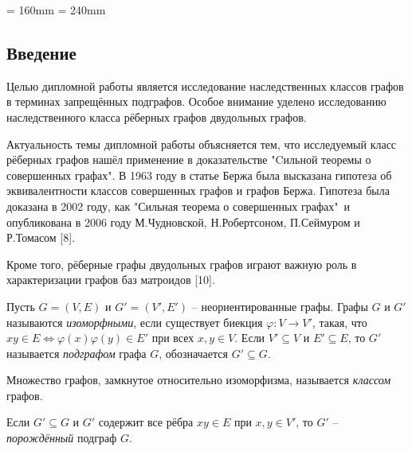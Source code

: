 \documentclass[12pt]{article}
\begin{document}
\large


\textwidth = 160mm
\textheight = 240mm



\newpage

\tableofcontents %

\newpage
\begin{center}
	\section*{Введение}
\end{center} 
	

Целью дипломной работы является исследование наследственных классов графов в терминах запрещённых подграфов. Особое внимание уделено исследованию наследственного класса рёберных графов двудольных графов.

Актуальность темы дипломной работы объясняется тем, что исследуемый класс рёберных графов нашёл применение в доказательстве "Cильной теоремы о совершенных графах". В 1963 году в статье  Бержа была высказана гипотеза об эквивалентности классов совершенных графов и графов Бержа. Гипотеза была доказана в 2002 году, как "Сильная теорема о совершенных графах"\ и опубликована в 2006 году М.Чудновской, Н.Робертсоном, П.Сеймуром и Р.Томасом [8].

Кроме того, рёберные графы двудольных графов играют важную роль в характеризации графов баз матроидов [10].

Пусть $G=(V,E)$ и $ G'=(V',E')$ -- неориентированные графы. Графы $G$ и $G'$ называются {\it изоморфными}, если существует биекция $\varphi : V \to V'$, такая, что $xy \in E \Leftrightarrow \varphi(x)\varphi(y) \in E'$ при всех $ x,y \in V$. Если $ V' \subseteq V$ и $E' \subseteq E$, то $G'$ называется {\it подграфом} графа $G$, обозначается $G' \subseteq G$.

Множество графов, замкнутое относительно изоморфизма, называется {\it классом} графов.

Если $G' \subseteq G$ и $G'$ содержит все рёбра $xy \in E$ при $x,y \in V'$, то $G'$ -- {\it порождённый} подграф $G$.
\end{document}

